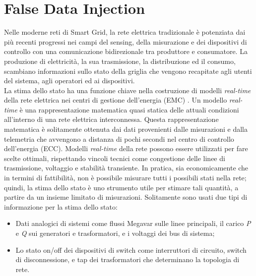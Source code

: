 
\section{False Data Injection}
Nelle moderne reti di Smart Grid, la rete elettrica tradizionale è potenziata dai più recenti progressi nei campi del sensing, della misurazione e dei dispositivi di controllo con una comunicazione bidirezionale tra produttore e consumatore. La produzione di elettricità, la sua trasmissione, la distribuzione ed il consumo, scambiano informazioni sullo stato della griglia che vengono recapitate agli utenti del sistema, agli operatori ed ai dispositivi.\\
La stima dello stato ha una funzione chiave nella costruzione di modelli \emph{real-time} della rete elettrica nei centri di gestione dell'energia (EMC) \cite{monticelli}. Un modello \emph{real-time} è una rappresentazione matematica quasi statica delle attuali condizioni all'interno di una rete elettrica interconnessa. Questa rappresentazione matematica è solitamente ottenuta dai dati provenienti dalle misurazioni e dalla telemetria che avvengono a distanza di pochi secondi nel centro di controllo dell'energia (ECC). Modelli \emph{real-time} della rete possono essere utilizzati per fare scelte ottimali, rispettando vincoli tecnici come congestione delle linee di trasmissione, voltaggio e stabilità transiente. In pratica, sia economicamente che in termini di fattibilità, non è possibile misurare tutti i possibili stati nella rete; quindi, la stima dello stato è uno strumento utile per stimare tali quantità, a partire da un insieme limitato di misurazioni. Solitamente sono usati due tipi di informazione per la stima dello stato:
\begin{itemize}
	\item Dati analogici di sistemi come flussi Megavar sulle linee principali, il carico \emph{P} e \emph{Q} sui generatori e trasformatori, e i voltaggi dei bus di sistema;
	\item Lo stato on/off dei dispositivi di switch come interruttori di circuito, switch di disconnessione, e tap dei trasformatori che determinano la topologia di rete.
\end{itemize}
